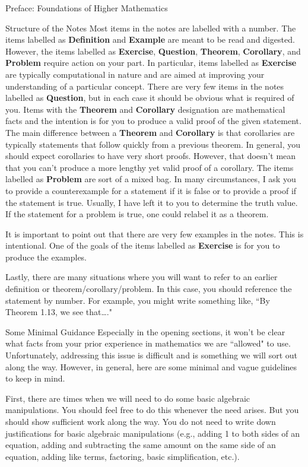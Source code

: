 \documentclass[11pt]{article}
\begin{document}
\begin{section}{Preface: Foundations of Higher Mathematics}
\begin{subsection}{Structure of the Notes}
Most items in the notes are labelled with a number.  The items labelled as \textbf{Definition} and \textbf{Example} are meant to be read and digested.  However, the items labelled as \textbf{Exercise}, \textbf{Question}, \textbf{Theorem}, \textbf{Corollary}, and \textbf{Problem} require action on your part.  In particular, items labelled as \textbf{Exercise} are typically computational in nature and are aimed at improving your understanding of a particular concept.  There are very few items in the notes labelled as \textbf{Question}, but in each case it should be obvious what is required of you.  Items with the \textbf{Theorem} and \textbf{Corollary} designation are mathematical facts and the intention is for you to produce a valid proof of the given statement.  The main difference between a \textbf{Theorem} and \textbf{Corollary} is that corollaries are typically statements that follow quickly from a previous theorem.  In general, you should expect corollaries to have very short proofs.  However, that doesn't mean that you can't produce a more lengthy yet valid proof of a corollary.  The items labelled as \textbf{Problem} are sort of a mixed bag.  In many circumstances, I ask you to provide a counterexample for a statement if it is false or to provide a proof if the statement is true.  Usually, I have left it to you to determine the truth value.  If the statement for a problem is true, one could relabel it as a theorem.

It is important to point out that there are very few examples in the notes.  This is intentional.  One of the goals of the items labelled as \textbf{Exercise} is for you to produce the examples.

Lastly, there are many situations where you will want to refer to an earlier definition or theorem/corollary/problem.  In this case, you should reference the statement by number.  For example, you might write something like, ``By Theorem 1.13, we see that\ldots."

\end{subsection}

\begin{subsection}{Some Minimal Guidance}
Especially in the opening sections, it won't be clear what facts from your prior experience in mathematics we are ``allowed" to use.  Unfortunately, addressing this issue is difficult and is something we will sort out along the way.  However, in general, here are some minimal and vague guidelines to keep in mind.  

First, there are times when we will need to do some basic algebraic manipulations.  You should feel free to do this whenever the need arises.  But you should show sufficient work along the way.  You do not need to write down justifications for basic algebraic manipulations (e.g., adding 1 to both sides of an equation, adding and subtracting the same amount on the same side of an equation, adding like terms, factoring, basic simplification, etc.).  


\end{subsection}
\end{section}
\end{document}
